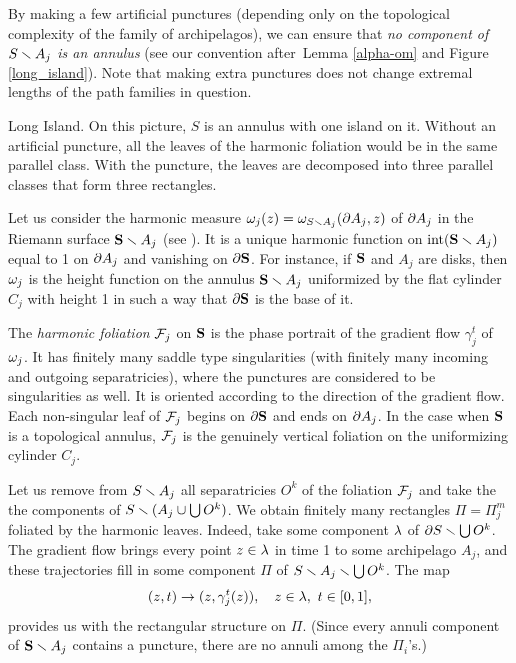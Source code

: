 

By making a few artificial punctures
(depending only on the topological complexity of the family of archipelagos),
we can  ensure that {\it no component of $S\smallsetminus A_j$ is an annulus} 
(see our convention after~Lemma \ref{alpha-om} and Figure \ref{long_island}).
Note that making extra  punctures  does  not change extremal lengths of the path
families in question.

%
{Long Island. On this picture, $S$ is an annulus with one island on it. 
Without an artificial puncture,
all the leaves of the harmonic foliation would be in the same parallel class. 
With the puncture, 
the leaves are decomposed into three parallel classes that form three rectangles.}

 Let us consider the harmonic measure ${\omega}_j(z)= {\omega}_{S\smallsetminus A_j} (\partial A_j, z)$ of  $\partial A_j$ in the 
Riemann surface ${\mathbf{S}}\smallsetminus A_j $ (see \cite{A}). It is a unique harmonic function on $\operatorname{int} ({\mathbf{S}}\smallsetminus A_j)$ 
equal to 1 on $\partial A_j$ and vanishing on $\partial {\mathbf{S}}$. 
For instance, if ${\mathbf{S}}$ and $A_j$ are disks, then ${\omega}_j$ is the  height function on the annulus ${\mathbf{S}}\smallsetminus A_j$ 
uniformized  by the flat cylinder $C_j$ with height 1 in such a way that $\partial {\mathbf{S}}$ is the base of it. 

The {\it harmonic foliation} ${\cal F}_j$ on ${\mathbf{S}}$ is the phase portrait of the gradient flow $\gamma_j^t$ of ${\omega}_j$.
It has finitely many saddle type singularities
(with finitely many incoming and outgoing separatricies),
where the punctures are considered to be  singularities as well. 
It is  oriented according to the direction of the gradient flow.
Each non-singular leaf of ${\cal F}_j$ begins on $\partial {\mathbf{S}}$ and ends on $\partial A_j$. 
In the case when ${\mathbf{S}}$ is a topological annulus, 
${\cal F}_j$ is the genuinely vertical foliation on the uniformizing cylinder $C_j$. 

Let us remove  from $S\smallsetminus A_j$ all separatricies $O^k $ of the foliation ${\cal F}_j$
and take the the components of  $S\smallsetminus (A_j\cup\bigcup O^k)$.
We obtain finitely many  rectangles $\Pi=\Pi_j^m$ 
foliated by the harmonic leaves. %
Indeed, take some component ${\lambda}$ of $\partial S\smallsetminus \bigcup O^k$.
The gradient flow brings every point $z\in {\lambda}$ in time 1 to some archipelago $ A_j$,
and these trajectories fill in some component $\Pi$ of $S\smallsetminus A_j\smallsetminus \bigcup O^k$.
The map 
$$ 
      (z, t)\rightarrow (z, \gamma_j^t (z)), \quad z\in {\lambda}, \ t\in [0,1],
$$ 
provides us with the rectangular structure on $\Pi$.  
(Since every annuli component of ${\mathbf{S}}\smallsetminus A_j$ contains a puncture, there are no annuli among the $\Pi_i$'s.) 



